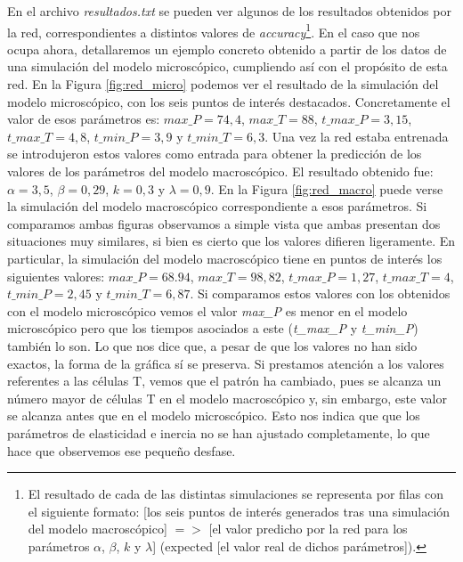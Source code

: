 

En el archivo \textit{resultados.txt} se pueden ver algunos de los resultados obtenidos por la red, correspondientes a distintos valores de \textit{accuracy}\footnote{El resultado de cada de las distintas simulaciones se representa por filas con el siguiente formato: [los seis puntos de interés generados tras una simulación del modelo macroscópico] $=>$ [el valor predicho por la red para los parámetros $\alpha$, $\beta$, $k$ y $\lambda$] (expected [el valor real de dichos parámetros]).}. En el caso que nos ocupa ahora, detallaremos un ejemplo concreto obtenido a partir de los datos de una simulación del modelo microscópico, cumpliendo así con el propósito de esta red. En la Figura \ref{fig:red_micro} podemos ver el resultado de la simulación del modelo microscópico, con los seis puntos de interés destacados. Concretamente el valor de esos parámetros es: $\textit{max\_P} = 74,4$, $\textit{max\_T} = 88$, $\textit{t\_max\_P} = 3,15$, $\textit{t\_max\_T} = 4,8$, $\textit{t\_min\_P} = 3,9$ y  $\textit{t\_min\_T} = 6,3$. Una vez la red estaba entrenada se introdujeron estos valores como entrada para obtener la predicción de los valores de los parámetros del modelo macroscópico. El resultado obtenido fue: $\alpha = 3,5$, $\beta = 0,29$, $k = 0,3$ y $\lambda = 0,9$. En la Figura \ref{fig:red_macro} puede verse la simulación del modelo macroscópico correspondiente a esos parámetros. Si comparamos ambas figuras observamos a simple vista que ambas presentan dos situaciones muy similares, si bien es cierto que los valores difieren ligeramente. En particular, la simulación del modelo macroscópico tiene en puntos de interés los siguientes valores: $\textit{max\_P} = 68.94$, $\textit{max\_T} = 98,82$, $\textit{t\_max\_P} = 1,27$, $\textit{t\_max\_T} =4$, $\textit{t\_min\_P} = 2,45$ y  $\textit{t\_min\_T} = 6,87$. Si comparamos estos valores con los obtenidos con el modelo microscópico vemos el valor \textit{max\_P} es menor en el modelo microscópico pero que los tiempos asociados a este (\textit{t\_max\_P} y \textit{t\_min\_P}) también lo son. Lo que nos dice que, a pesar de que los valores no han sido exactos, la forma de la gráfica sí se preserva. Si prestamos atención a los valores referentes a las células T, vemos que el patrón ha cambiado, pues se alcanza un número mayor de células T en el modelo macroscópico y, sin embargo, este valor se alcanza antes que en el modelo microscópico. Esto nos indica que que los parámetros de elasticidad e inercia no se han ajustado completamente, lo que hace que observemos ese pequeño desfase.



